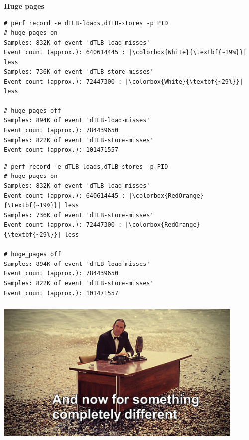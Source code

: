 \documentclass[usenames,dvipsnames, 18pt, compress, aspectratio=169]{beamer}
\begin{document}
\begin{frame}[fragile]{}
    \frametitle{}
    \begin{center}
        \textbf{Huge pages}

    \begin{overprint}
        \begin{flushleft}
        \begin{verbatim}
# perf record -e dTLB-loads,dTLB-stores -p PID
# huge_pages on
Samples: 832K of event 'dTLB-load-misses'
Event count (approx.): 640614445 : |\colorbox{White}{\textbf{~19%}}| less
Samples: 736K of event 'dTLB-store-misses'
Event count (approx.): 72447300 : |\colorbox{White}{\textbf{~29%}}| less

# huge_pages off
Samples: 894K of event 'dTLB-load-misses'
Event count (approx.): 784439650
Samples: 822K of event 'dTLB-store-misses'
Event count (approx.): 101471557
        \end{verbatim}
        \end{flushleft}

        \begin{flushleft}
        \begin{verbatim}
# perf record -e dTLB-loads,dTLB-stores -p PID
# huge_pages on
Samples: 832K of event 'dTLB-load-misses'
Event count (approx.): 640614445 : |\colorbox{RedOrange}{\textbf{~19%}}| less
Samples: 736K of event 'dTLB-store-misses'
Event count (approx.): 72447300 : |\colorbox{RedOrange}{\textbf{~29%}}| less

# huge_pages off
Samples: 894K of event 'dTLB-load-misses'
Event count (approx.): 784439650
Samples: 822K of event 'dTLB-store-misses'
Event count (approx.): 101471557
        \end{verbatim}
        \end{flushleft}

    \end{overprint}
    \end{center}
\end{frame}

\begin{frame}
    \frametitle{}
    \begin{center}

    \includegraphics[width=0.9\textwidth,center]{different.jpg}

    \end{center}
\end{frame}
\end{document}
